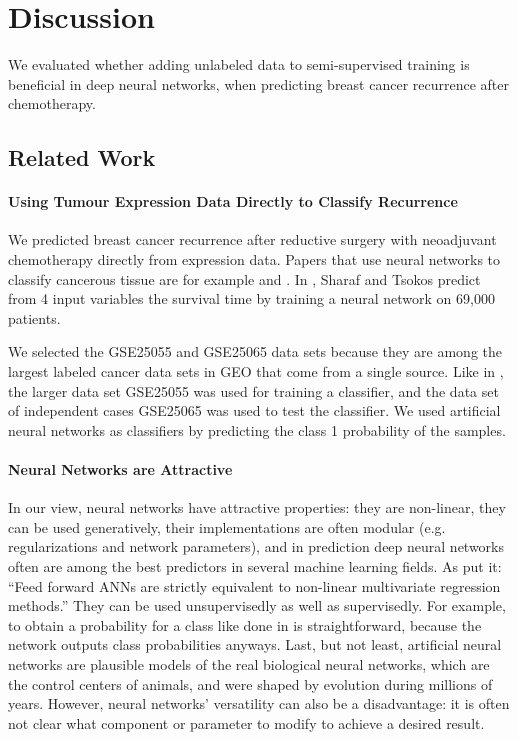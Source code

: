 
\section{Discussion}

We evaluated whether adding unlabeled data to semi-supervised training
is beneficial in deep neural networks, when predicting breast cancer
recurrence after chemotherapy.

\subsection{Related Work}

\paragraph{Using Tumour Expression Data Directly to Classify Recurrence}

We predicted breast cancer recurrence after reductive surgery with
neoadjuvant chemotherapy directly from expression data. Papers that
use neural networks to classify cancerous tissue are for example \cite{ChenHuang2002}
and \cite{ErcalMoss1994}. In \cite{SharafTsokos2015}, Sharaf and
Tsokos predict from 4 input variables the survival time by training
a neural network on 69,000 patients.

We selected the GSE25055 and GSE25065 data sets because they are among
the largest labeled cancer data sets in GEO that come from a single
source. Like in \cite{HatzisSymmans2011}, the larger data set GSE25055
was used for training a classifier, and the data set of independent
cases GSE25065 was used to test the classifier. We used artificial
neural networks as classifiers by predicting the class 1 probability
of the samples.

\paragraph{Neural Networks are Attractive}

In our view, neural networks have attractive properties: they are
non-linear, they can be used generatively, their implementations are
often modular (e.g. regularizations and network parameters), and in
prediction deep neural networks often are among the best predictors
in several machine learning fields. As \cite{BiganzoliMarubini1998}
 put it: ``Feed forward ANNs are strictly equivalent to non-linear
multivariate regression methods.'' They can be used unsupervisedly
as well as supervisedly. For example, to obtain a probability for
a class like done in \cite{AppelSpang2011} is straightforward, because
the network outputs class probabilities anyways. Last, but not least,
artificial neural networks are plausible models of the real biological
neural networks, which are the control centers of animals, and were
shaped by evolution during millions of years. However, neural networks'
versatility can also be a disadvantage: it is often not clear what
component or parameter to modify to achieve a desired result.

